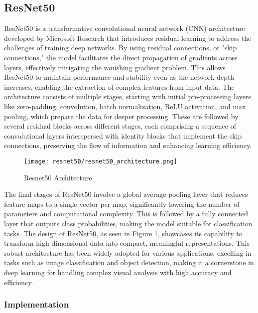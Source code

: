 \subsection{ResNet50}\label{resnet50}

ResNet50 \cite{He_Zhang_Ren_Sun_2015} is a transformative convolutional neural network (CNN) architecture developed by Microsoft Research that introduces residual learning to address the challenges of training deep networks. By using residual connections, or "skip connections," the model facilitates the direct propagation of gradients across layers, effectively mitigating the vanishing gradient problem. This allows ResNet50 to maintain performance and stability even as the network depth increases, enabling the extraction of complex features from input data. The architecture consists of multiple stages, starting with initial pre-processing layers like zero-padding, convolution, batch normalization, ReLU activation, and max pooling, which prepare the data for deeper processing. These are followed by several residual blocks across different stages, each comprising a sequence of convolutional layers interspersed with identity blocks that implement the skip connections, preserving the flow of information and enhancing learning efficiency.

\begin{figure}[H]
  \begin{center}
    \texttt{[image: resnet50/resnet50\_architecture.png]}
  \end{center}
  \caption{Resnet50 Architecture}\label{f:resnet50_architecture}
\end{figure}

The final stages of ResNet50 involve a global average pooling layer that reduces feature maps to a single vector per map, significantly lowering the number of parameters and computational complexity. This is followed by a fully connected layer that outputs class probabilities, making the model suitable for classification tasks. The design of ResNet50, as seen in Figure \ref{f:resnet50_architecture}, showcases its capability to transform high-dimensional data into compact, meaningful representations. This robust architecture has been widely adopted for various applications, excelling in tasks such as image classification and object detection, making it a cornerstone in deep learning for handling complex visual analysis with high accuracy and efficiency.

\subsubsection{Implementation}

